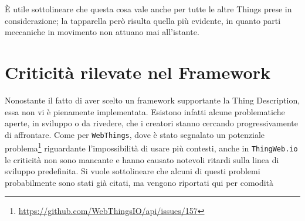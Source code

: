 \documentclass[12pt,a4paper,openright,oneside]{report}
\begin{document}
È utile sottolineare che questa cosa vale anche per tutte le altre Things prese in considerazione; la tapparella però risulta quella più evidente, in quanto parti meccaniche in movimento non attuano mai all'istante.



\section{Criticità rilevate nel Framework}
\label{sec:issues}
Nonostante il fatto di aver scelto un framework supportante la Thing Description, essa non vi è pienamente implementata. Esistono infatti alcune problematiche aperte, in sviluppo o da rivedere, che i creatori stanno cercando progressivamente di affrontare. Come per \texttt{WebThings}, dove è stato segnalato un potenziale problema\footnote{\url{https://github.com/WebThingsIO/api/issues/157}} riguardante l'impossibilità di usare più contesti, anche in \texttt{ThingWeb.io} le criticità non sono mancante e hanno causato notevoli ritardi sulla linea di sviluppo predefinita. Si vuole sottolineare che alcuni di questi problemi probabilmente sono stati già citati, ma vengono riportati qui per comodità
\end{document}
